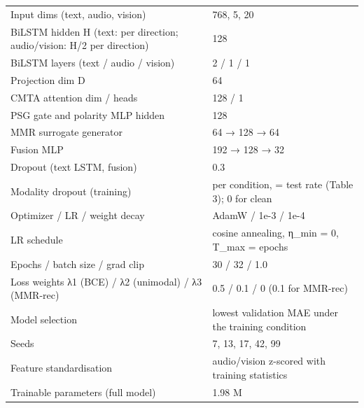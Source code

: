 \begin{tabular}{ll}
\hline
Input dims (text, audio, vision) & 768, 5, 20 \\
BiLSTM hidden H (text: per direction; audio/vision: H/2 per direction) & 128 \\
BiLSTM layers (text / audio / vision) & 2 / 1 / 1 \\
Projection dim D & 64 \\
CMTA attention dim / heads & 128 / 1 \\
PSG gate and polarity MLP hidden & 128 \\
MMR surrogate generator & 64 → 128 → 64 \\
Fusion MLP & 192 → 128 → 32 \\
Dropout (text LSTM, fusion) & 0.3 \\
Modality dropout (training) & per condition, = test rate (Table 3); 0 for clean \\
Optimizer / LR / weight decay & AdamW / 1e-3 / 1e-4 \\
LR schedule & cosine annealing, η_min = 0, T_max = epochs \\
Epochs / batch size / grad clip & 30 / 32 / 1.0 \\
Loss weights λ1 (BCE) / λ2 (unimodal) / λ3 (MMR-rec) & 0.5 / 0.1 / 0 (0.1 for MMR-rec) \\
Model selection & lowest validation MAE under the training condition \\
Seeds & 7, 13, 17, 42, 99 \\
Feature standardisation & audio/vision z-scored with training statistics \\
Trainable parameters (full model) & 1.98 M \\
\hline
\end{tabular}


